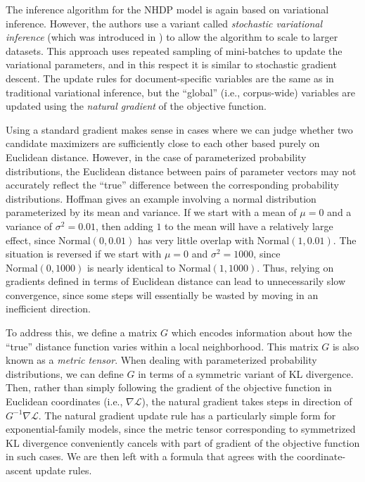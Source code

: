 \documentclass{article}
\begin{document}
The inference algorithm for the NHDP model is again based on variational inference.
However, the authors use a variant called \emph{stochastic variational inference} (which was introduced in \cite{hoffman2013stochastic}) to allow the algorithm to scale to larger datasets.
This approach uses repeated sampling of mini-batches to update the variational parameters, and in this respect it is similar to stochastic gradient descent.
The update rules for document-specific variables are the same as in traditional variational inference, but the ``global'' (i.e., corpus-wide) variables are updated using the \emph{natural gradient} of the objective function.

Using a standard gradient makes sense in cases where we can judge whether two candidate maximizers are sufficiently close to each other based purely on Euclidean distance.
However, in the case of parameterized probability distributions, the Euclidean distance between pairs of parameter vectors may not accurately reflect the ``true'' difference between the corresponding probability distributions.
Hoffman \cite{hoffman2013stochastic} gives an example involving a normal distribution parameterized by its mean and variance.
If we start with a mean of $\mu = 0$ and a variance of $\sigma^2 = 0.01$, then adding $1$ to the mean will have a relatively large effect, since $\mathrm{Normal}(0, 0.01)$ has very little overlap with $\mathrm{Normal}(1, 0.01)$.
The situation is reversed if we start with $\mu = 0$ and $\sigma^2 = 1000$, since $\mathrm{Normal}(0, 1000)$ is nearly identical to $\mathrm{Normal}(1, 1000)$.
Thus, relying on gradients defined in terms of Euclidean distance can lead to unnecessarily slow convergence, since some steps will essentially be wasted by moving in an inefficient direction.

To address this, we define a matrix $G$ which encodes information about how the ``true'' distance function varies within a local neighborhood.
This matrix $G$ is also known as a \emph{metric tensor}.
When dealing with parameterized probability distributions, we can define $G$ in terms of a symmetric variant of KL divergence.
Then, rather than simply following the gradient of the objective function in Euclidean coordinates (i.e., $\nabla \mathcal L$), the natural gradient takes steps in direction of $G^{-1} \nabla \mathcal L$.
The natural gradient update rule has a particularly simple form for exponential-family models, since the metric tensor corresponding to symmetrized KL divergence conveniently cancels with part of gradient of the objective function in such cases.
We are then left with a formula that agrees with the coordinate-ascent update rules.
\end{document}
